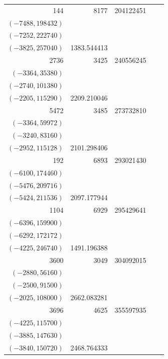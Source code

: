 \documentclass[11pt]{article}
\begin{document}
\begin{longtable}{r r r l r}
144 & 8177 & 204122451 & \begin{tabular}[t]{@{}l@{}}$(-7956,119340)$\\$(-7488,198432)$\\$(-7252,222740)$\\$(-3825,257040)$\end{tabular} & 1383.544413\\[5pt]
2736 & 3425 & 240556245 & \begin{tabular}[t]{@{}l@{}}$(-3420,10260)$\\$(-3364,35380)$\\$(-2740,101380)$\\$(-2205,115290)$\end{tabular} & 2209.210046\\[5pt]
5472 & 3485 & 273732810 & \begin{tabular}[t]{@{}l@{}}$(-3420,44460)$\\$(-3364,59972)$\\$(-3240,83160)$\\$(-2952,115128)$\end{tabular} & 2101.298406\\[5pt]
192 & 6893 & 293021430 & \begin{tabular}[t]{@{}l@{}}$(-6348,150420)$\\$(-6100,174460)$\\$(-5476,209716)$\\$(-5424,211536)$\end{tabular} & 2097.177944\\[5pt]
1104 & 6929 & 295429641 & \begin{tabular}[t]{@{}l@{}}$(-6900,40020)$\\$(-6396,159900)$\\$(-6292,172172)$\\$(-4225,246740)$\end{tabular} & 1491.196388\\[5pt]
3600 & 3049 & 304092015 & \begin{tabular}[t]{@{}l@{}}$(-2940,45780)$\\$(-2880,56160)$\\$(-2500,91500)$\\$(-2025,108000)$\end{tabular} & 2662.083281\\[5pt]
3696 & 4625 & 355597935 & \begin{tabular}[t]{@{}l@{}}$(-4620,13860)$\\$(-4225,115700)$\\$(-3885,147630)$\\$(-3840,150720)$\end{tabular} & 2468.764333\\[5pt]

\end{longtable}
\end{document}
